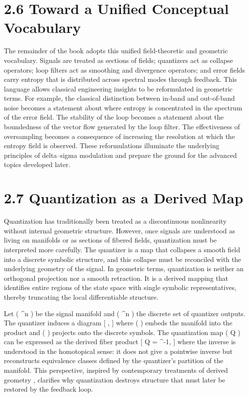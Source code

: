 \section*{2.6 Toward a Unified Conceptual Vocabulary}

The remainder of the book adopts this unified field-theoretic and geometric vocabulary. Signals are treated as sections of fields; quantizers act as collapse operators; loop filters act as smoothing and divergence operators; and error fields carry entropy that is distributed across spectral modes through feedback. This language allows classical engineering insights to be reformulated in geometric terms. For example, the classical distinction between in-band and out-of-band noise becomes a statement about where entropy is concentrated in the spectrum of the error field. The stability of the loop becomes a statement about the boundedness of the vector flow generated by the loop filter. The effectiveness of oversampling becomes a consequence of increasing the resolution at which the entropy field is observed. These reformulations illuminate the underlying principles of delta--sigma modulation and prepare the ground for the advanced topics developed later.

\section*{2.7 Quantization as a Derived Map}

Quantization has traditionally been treated as a discontinuous nonlinearity without internal geometric structure. However, once signals are understood as living on manifolds or as sections of fibered fields, quantization must be interpreted more carefully. The quantizer is a map that collapses a smooth field into a discrete symbolic structure, and this collapse must be reconciled with the underlying geometry of the signal. In geometric terms, quantization is neither an orthogonal projection nor a smooth retraction. It is a derived mapping that identifies entire regions of the state space with single symbolic representatives, thereby truncating the local differentiable structure.

Let (  \subset {}^n ) be the signal manifold and ( \Lambda \subset {}^n ) the discrete set of quantizer outputs. The quantizer induces a diagram
[
 \xleftarrow{;;\iota;;}  \times \Lambda \xrightarrow{;;\pi;;} \Lambda,
]
where ( \iota ) embeds the manifold into the product and ( \pi ) projects onto the discrete symbols. The quantization map ( Q ) can be expressed as the derived fiber product
[
Q = \pi \circ \iota^{-1},
]
where the inverse is understood in the homotopical sense: it does not give a pointwise inverse but reconstructs equivalence classes defined by the quantizer's partition of the manifold. This perspective, inspired by contemporary treatments of derived geometry \citep{lurie2009higher}, clarifies why quantization destroys structure that must later be restored by the feedback loop.

